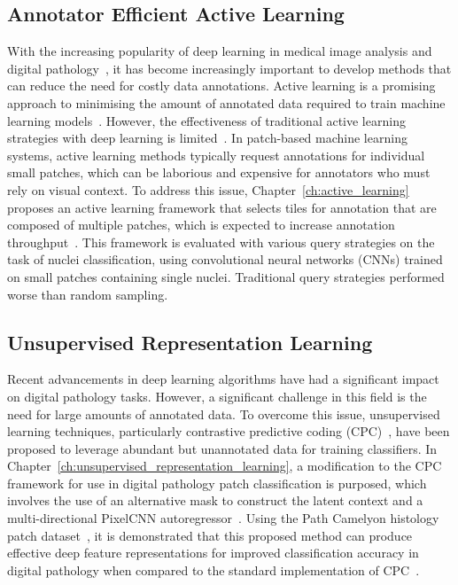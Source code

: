 \subsection*{Annotator Efficient Active Learning}
With the increasing popularity of deep learning in medical image analysis and digital pathology~\citep{tizhoosh2018artificial}, it has become increasingly important to develop methods that can reduce the need for costly data annotations. Active learning is a promising approach to minimising the amount of annotated data required to train machine learning models~\citep{settles2009active}. However, the effectiveness of traditional active learning strategies with deep learning is limited~\citep{wang2016cost}. In patch-based machine learning systems, active learning methods typically request annotations for individual small patches, which can be laborious and expensive for annotators who must rely on visual context. To address this issue, Chapter~\ref{ch:active_learning} proposes an active learning framework that selects tiles for annotation that are composed of multiple patches, which is expected to increase annotation throughput~\citep{carse2019active}. This framework is evaluated with various query strategies on the task of nuclei classification, using convolutional neural networks (CNNs) trained on small patches containing single nuclei. Traditional query strategies performed worse than random sampling.

\subsection*{Unsupervised Representation Learning}
Recent advancements in deep learning algorithms have had a significant impact on digital pathology tasks. However, a significant challenge in this field is the need for large amounts of annotated data. To overcome this issue, unsupervised learning techniques, particularly contrastive predictive coding (CPC)~\citep{oord2018representation}, have been proposed to leverage abundant but unannotated data for training classifiers. In Chapter~\ref{ch:unsupervised_representation_learning}, a modification to the CPC framework for use in digital pathology patch classification is purposed, which involves the use of an alternative mask to construct the latent context and a multi-directional PixelCNN autoregressor~\citep{oord2016pixel}. Using the Path Camelyon histology patch dataset~\citep{veeling2018rotation}, it is demonstrated that this proposed method can produce effective deep feature representations for improved classification accuracy in digital pathology when compared to the standard implementation of CPC~\citep{carse2021unsupervised}.

